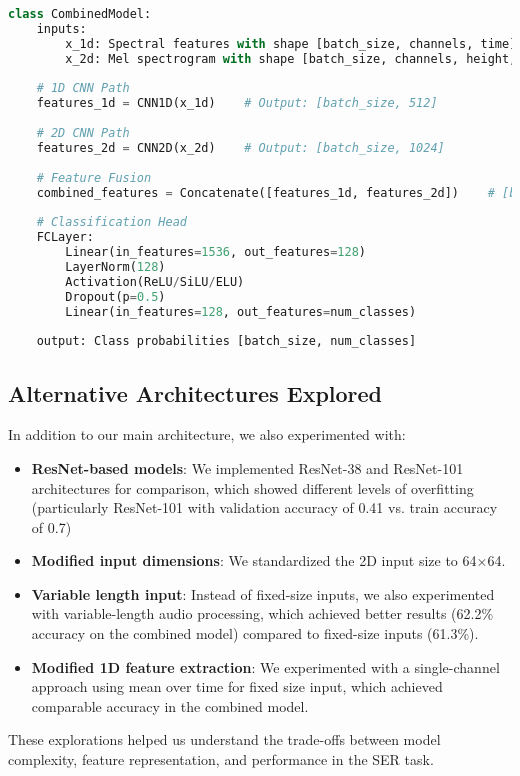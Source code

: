 \begin{lstlisting}[language=Python, style=pseudocode, caption=Combined Model Architecture (Pseudocode)]
class CombinedModel:
    inputs:
        x_1d: Spectral features with shape [batch_size, channels, time]
        x_2d: Mel spectrogram with shape [batch_size, channels, height, width]
    
    # 1D CNN Path
    features_1d = CNN1D(x_1d)    # Output: [batch_size, 512]
    
    # 2D CNN Path  
    features_2d = CNN2D(x_2d)    # Output: [batch_size, 1024]
    
    # Feature Fusion
    combined_features = Concatenate([features_1d, features_2d])    # [batch_size, 1536]
    
    # Classification Head
    FCLayer:
        Linear(in_features=1536, out_features=128)
        LayerNorm(128)
        Activation(ReLU/SiLU/ELU)
        Dropout(p=0.5)
        Linear(in_features=128, out_features=num_classes)
    
    output: Class probabilities [batch_size, num_classes]
\end{lstlisting}

\subsection{Alternative Architectures Explored}

In addition to our main architecture, we also experimented with:

\begin{itemize}
    \item \textbf{ResNet-based models}: We implemented ResNet-38 and ResNet-101 architectures for comparison, which showed different levels of overfitting (particularly ResNet-101 with validation accuracy of 0.41 vs. train accuracy of 0.7)
    
    \item \textbf{Modified input dimensions}: We standardized the 2D input size to 64×64.
    
    \item \textbf{Variable length input}: Instead of fixed-size inputs, we also experimented with variable-length audio processing, which achieved better results (62.2\% accuracy on the combined model) compared to fixed-size inputs (61.3\%).
    
    \item \textbf{Modified 1D feature extraction}: We experimented with a single-channel approach using mean over time for fixed size input, which achieved comparable accuracy in the combined model.
\end{itemize}

These explorations helped us understand the trade-offs between model complexity, feature representation, and performance in the SER task. 